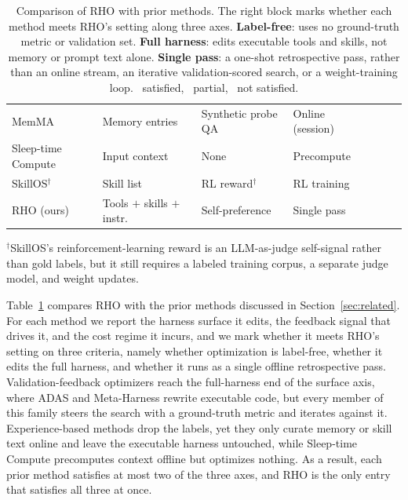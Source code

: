 \documentclass{llmxive}
\providecommand{\cfull}{\CIRCLE}
\providecommand{\chalf}{\LEFTcircle}
\providecommand{\cnone}{\Circle}
\providecommand{\method}{\textsc{RHO}}
\begin{document}
\begin{table}[t]
{\begin{tabular}{llllccc}
\rowcolor{rowAlt}
MemMA \citep{lin2026memma}                & Memory entries          & Synthetic probe QA               & Online (session)    & \cfull & \cnone & \cnone \\
\rowcolor{white}
Sleep-time Compute \citep{lin2025sleeptime} & Input context         & None                             & Precompute          & \cfull & \cnone & \cfull \\
\rowcolor{rowAlt}
SkillOS$^\dagger$ \citep{ouyang2026skillos} & Skill list            & RL reward$^\dagger$              & RL training         & \chalf & \chalf & \cnone \\
\midrule
\rowcolor{rhoBlue}
\method{} (ours)                          & Tools $+$ skills $+$ instr.\ & Self-preference             & Single pass         & \cfull & \cfull & \cfull \\
\bottomrule
\end{tabular}%
}

\vspace{2pt}
{\footnotesize $^\dagger$SkillOS's reinforcement-learning reward is an LLM-as-judge self-signal rather than gold labels, but it still requires a labeled training corpus, a separate judge model, and weight updates.}
\caption{ Comparison of \method{} with prior methods.
The right block marks whether each method meets \method{}'s setting along three axes.
\textbf{Label-free}: uses no ground-truth metric or validation set.
\textbf{Full harness}: edits executable tools and skills, not memory or prompt text alone.
\textbf{Single pass}: a one-shot retrospective pass, rather than an online stream, an iterative validation-scored search, or a weight-training loop.
\cfull{}~satisfied, \chalf{}~partial, \cnone{}~not satisfied.}
\label{tab:positioning}
\end{table}

Table~\ref{tab:positioning} compares \method{} with the prior methods discussed in Section~\ref{sec:related}.
For each method we report the harness surface it edits, the feedback signal that drives it, and the cost regime it incurs, and we mark whether it meets \method{}'s setting on three criteria, namely whether optimization is label-free, whether it edits the full harness, and whether it runs as a single offline retrospective pass.
Validation-feedback optimizers reach the full-harness end of the surface axis, where ADAS and Meta-Harness rewrite executable code, but every member of this family steers the search with a ground-truth metric and iterates against it.
Experience-based methods drop the labels, yet they only curate memory or skill text online and leave the executable harness untouched, while Sleep-time Compute precomputes context offline but optimizes nothing.
As a result, each prior method satisfies at most two of the three axes, and \method{} is the only entry that satisfies all three at once.
\end{document}
